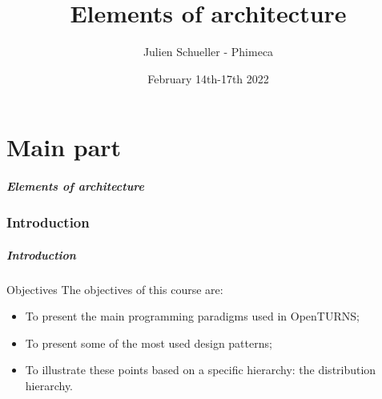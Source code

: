 \documentclass[8pt]{beamer}
\title{Elements of architecture}
\author{Julien Schueller - Phimeca}
\date{February 14th-17th 2022}
\institute{\small OpenTURNS Consortium}
\begin{document}
\frame{\titlepage}

\part{Main part}

\begin{frame}
  \Large
  \frametitle{Elements of architecture}
  \tableofcontents[part=1]
\end{frame}
\section[]{Introduction}
\begin{frame}
  \frametitle{Introduction}
  \begin{block}{Objectives}
    The objectives of this course are:
    \begin{itemize}
    \item To present the main programming paradigms used in OpenTURNS;
    \item To present some of the most used design patterns;
    \item To illustrate these points based on a specific hierarchy: the distribution hierarchy.
    \end{itemize}
  \end{block}
\end{frame}
\end{document}
